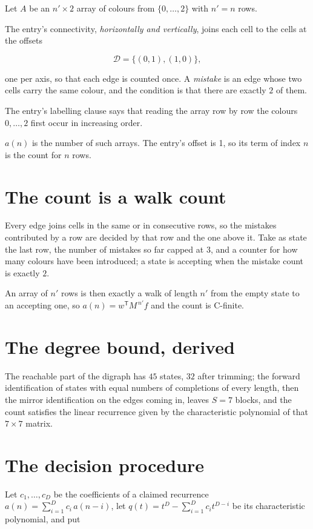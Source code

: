 \documentclass[11pt]{article}
\theoremstyle{definition}
\begin{document}
Let $A$ be an $n' \times 2$ array of colours from $\{0,\dots,2\}$ with $n' = n$ rows.

The entry's connectivity, {\itshape horizontally and vertically}, joins each cell to the cells at the offsets

\[\mathcal{D} = \{(0,1), (1,0)\},\]

one per axis, so that each edge is counted once. A {\itshape mistake} is an edge whose two cells carry the same colour, and the condition is that there are exactly $2$ of them.

The entry's labelling clause says that reading the array row by row the colours $0,\dots,2$ first occur in increasing order.

$a(n)$ is the number of such arrays. The entry's offset is 1, so its term of index $n$ is the count for $n$ rows.

\section{The count is a walk count}

Every edge joins cells in the same or in consecutive rows, so the mistakes contributed by a row are decided by that row and the one above it. Take as state the last row, the number of mistakes so far capped at $3$, and a counter for how many colours have been introduced; a state is accepting when the mistake count is exactly $2$.

An array of $n'$ rows is then exactly a walk of length $n'$ from the empty state to an accepting one, so $a(n) = w^{\mathsf T}M^{\,n'}f$ and the count is C-finite.

\section{The degree bound, derived}

The reachable part of the digraph has $45$ states, $32$ after trimming; the forward identification of states with equal numbers of completions of every length, then the mirror identification on the edges coming in, leaves $S = 7$ blocks, and the count satisfies the linear recurrence given by the characteristic polynomial of that $7\times7$ matrix.

\section{The decision procedure}

Let $c_1,\dots,c_D$ be the coefficients of a claimed recurrence $a(n) = \sum_{i=1}^{D} c_i\,a(n-i)$, let $q(t) = t^{D} - \sum_{i=1}^{D} c_i t^{D-i}$ be its characteristic polynomial, and put
\end{document}
